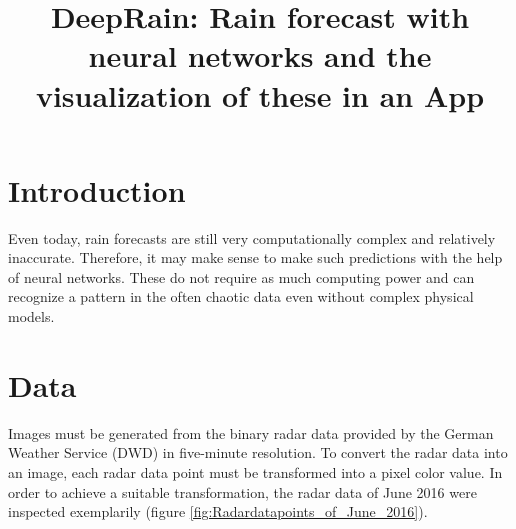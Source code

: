 \documentclass[oneside]{htwg-report}
\begin{document}



\newcommand{\verfasserA}{Simon Christofzik}
\newcommand{\verfasserB}{Paul Sutter}
\newcommand{\verfasserC}{Till Reitlinger}
\newcommand{\thema}{DeepRain: Rain forecast with neural networks and the visualization of these in an App}
\newcommand{\hoschschule}{HTWG Konstanz - University of Applied Sciences}
\newcommand{\institut}{HTWG Konstanz - Institute for Optical Systems}
\newcommand{\prueferA}{Prof. Dr. Oliver Dürr}


\title[Teamprojektthema]{\thema}


\makecover[]


\twocolumn
\section*{Introduction}

\begin{sloppypar}
Even today, rain forecasts are still very computationally complex and relatively inaccurate. 
Therefore, it may make sense to make such predictions with the help of neural networks. 
These do not require as much computing power and can recognize a pattern in the often chaotic data even without complex physical models.
\end{sloppypar}

\section*{Data}\label{data}
Images must be generated from the binary radar data provided by the German Weather Service (DWD) in five-minute resolution.
To convert the radar data into an image, each radar data point must be transformed into a pixel color value.
In order to achieve a suitable transformation, the radar data of June 2016 were inspected exemplarily (figure \ref{fig:Radardatapoints_of_June_2016}). 
\end{document}
